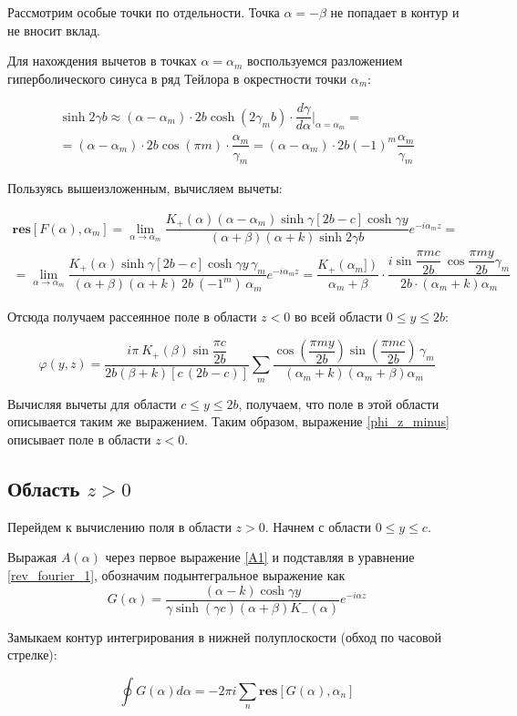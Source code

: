 \documentclass[a4paper,12pt]{article}
\begin{document}
Рассмотрим особые точки по отдельности. Точка $\alpha = -\beta$ не попадает в контур и не вносит вклад.

Для нахождения вычетов в точках $\alpha = \alpha_m$ воспользуемся разложением гиперболического синуса в ряд Тейлора в окрестности точки $\alpha_m$:

\begin{multline}
    \sinh 2\gamma b \approx (\alpha - \alpha_m) \cdot 2b \cosh (2 \gamma_m b) \cdot \dfrac{d\gamma}{d\alpha} \Bigg|_{\alpha=\alpha_m} = \\ = (\alpha - \alpha_m) \cdot 2b  \cos(\pi m) \cdot \dfrac{\alpha_m}{\gamma_m} =  \boxed{(\alpha - \alpha_m) \cdot 2b (-1)^m \dfrac{\alpha_m}{\gamma_m}} \label{sinh}
\end{multline}

Пользуясь вышеизложенным, вычисляем вычеты:

\begin{multline}
    \textbf{res}[F(\alpha), \alpha_m] = \lim_{\alpha \to \alpha_m} \dfrac{K_+(\alpha)(\alpha - \alpha_m) \sinh{\gamma[2b - c]} \cosh{\gamma y}}{(\alpha + \beta)(\alpha + k)\sinh{2\gamma b}}e^{-i \alpha_m z} = \\ = \lim_{\alpha \to \alpha_m} \dfrac{K_+(\alpha) \sinh{\gamma[2b - c]}  \cosh{\gamma y}\, \gamma_m}{(\alpha + \beta)(\alpha + k)\ 2b\ (-1^m)\, \alpha_m} e^{-i \alpha_m z} = \dfrac{K_+(\alpha_m])}{\alpha_m + \beta}\cdot \dfrac{i \sin{\dfrac{\pi m c}{2b}} \ \cos{\dfrac{\pi m y}{2b}} \gamma_m}{2b \cdot (\alpha_m + k) \alpha_m}
\end{multline}

Отсюда получаем рассеянное поле в области $z<0$ во всей области $0\le y\le 2b$:

\begin{equation}
    \label{phi_z_minus}
    \varphi(y,z) =  \dfrac{i \pi \ K_+(\beta) \sin{\dfrac{\pi c}{2b}}}{2b (\beta + k) [c\,(2b - c)]} \sum \limits_{m} \dfrac{\cos\left(\dfrac{\pi m y}{2b}\right)\sin\left(\dfrac{\pi m c}{2b}\right)\, \gamma_m}{(\alpha_m +k)(\alpha_m + \beta) \alpha_m}
\end{equation}

Вычисляя вычеты для области $c \leq y \leq 2b$, получаем, что поле в этой области описывается таким же выражением. Таким образом, выражение \ref{phi_z_minus} описывает поле в области $z < 0$.

\subsection*{Область $z>0$}

Перейдем к вычислению поля в области $z > 0$. Начнем с области $0 \leq y \leq c$.

Выражая $A(\alpha)$ через первое выражение \ref{A1} и подставляя в уравнение \ref{rev_fourier_1}, обозначим подынтегральное выражение как
$$
G(\alpha) = \dfrac{(\alpha - k) \cosh \gamma y}{\gamma \sinh(\gamma c) (\alpha + \beta) K_-(\alpha)} e^{-i\alpha z}
$$

Замыкаем контур интегрирования в нижней полуплоскости (обход по часовой стрелке):

\begin{equation}
     \oint G(\alpha) d \alpha = - 2 \pi i \sum_n \textbf{res}[G(\alpha), \alpha_n]
\end{equation}
\end{document}
